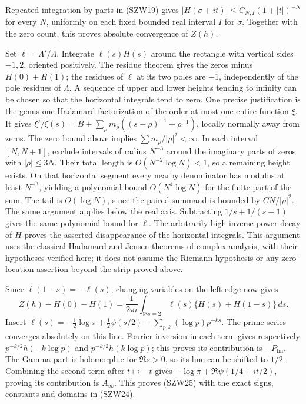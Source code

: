\documentclass[
  10pt,
  a4paper,
]{article}
\begin{document}
Repeated integration by parts in (SZW19) gives
\(|H(\sigma+it)|\le C_{N,I}(1+|t|)^{-N}\) for every \(N\), uniformly on
each fixed bounded real interval \(I\) for \(\sigma\). Together with the
zero count, this proves absolute convergence of \(Z(h)\).

Set \(\ell=\Lambda'/\Lambda\). Integrate \(\ell(s)H(s)\) around the
rectangle with vertical sides \(-1,2\), oriented positively. The residue
theorem gives the zeros minus \(H(0)+H(1)\); the residues of \(\ell\) at
its two poles are \(-1\), independently of the pole residues of
\(\Lambda\). A sequence of upper and lower heights tending to infinity
can be chosen so that the horizontal integrals tend to zero. One precise
justification is the genus-one Hadamard factorization of the
order-at-most-one entire function \(\xi\). It gives
\(\xi'/\xi(s)=B+\sum_\rho m_\rho((s-\rho)^{-1}+\rho^{-1})\), locally
normally away from zeros. The zero bound above implies
\(\sum m_\rho/|\rho|^2<\infty\). In each interval \([N,N+1]\), exclude
intervals of radius \(N^{-3}\) around the imaginary parts of zeros with
\(|\rho|\le3N\). Their total length is \(O(N^{-2}\log N)<1\), so a
remaining height exists. On that horizontal segment every nearby
denominator has modulus at least \(N^{-3}\), yielding a polynomial bound
\(O(N^4\log N)\) for the finite part of the sum. The tail is
\(O(\log N)\), since the paired summand is bounded by \(C N/|\rho|^2\).
The same argument applies below the real axis. Subtracting
\(1/s+1/(s-1)\) gives the same polynomial bound for \(\ell\). The
arbitrarily high inverse-power decay of \(H\) proves the asserted
disappearance of the horizontal integrals. This argument uses the
classical Hadamard and Jensen theorems of complex analysis, with their
hypotheses verified here; it does not assume the Riemann hypothesis or
any zero-location assertion beyond the strip proved above.

Since \(\ell(1-s)=-\ell(s)\), changing variables on the left edge now
gives \[
Z(h)-H(0)-H(1)=\frac1{2\pi i}\int_{\Re s=2}
\ell(s)\{H(s)+H(1-s)\}\,ds.
\tag{SZW26}
\] Insert
\(\ell(s)=-\tfrac12\log\pi+\tfrac12\psi(s/2)-\sum_{p,k}(\log p)p^{-ks}\).
The prime series converges absolutely on this line. Fourier inversion in
each term gives respectively \(p^{-k/2}h(-k\log p)\) and
\(p^{-k/2}h(k\log p)\); this proves its contribution is
\(-P_{\mathrm{fin}}\). The Gamma part is holomorphic for \(\Re s>0\), so
its line can be shifted to \(1/2\). Combining the second term after
\(t\mapsto-t\) gives \(-\log\pi+\Re\psi(1/4+it/2)\), proving its
contribution is \(A_\infty\). This proves (SZW25) with the exact signs,
constants and domains in (SZW24).
\end{document}
